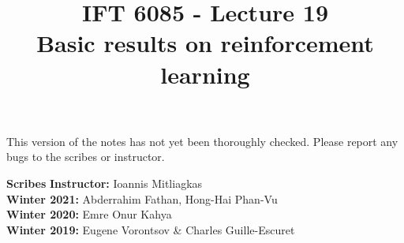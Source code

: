 \documentclass{article}
\title{IFT 6085 - Lecture 19 \\ 
Basic results on reinforcement learning}
\date{}
\begin{document}
 

\maketitle

\vspace{-0.5in}
\begin{center}
This version of the notes has not yet been thoroughly checked.
Please report any bugs to the scribes or instructor.
\end{center}
\vspace{0.2in}

\textbf{Scribes}\hfill
\textbf{Instructor:}  Ioannis Mitliagkas\\
\textbf{Winter 2021:} Abderrahim Fathan, Hong-Hai Phan-Vu\\
\textbf{Winter 2020:} Emre Onur Kahya\\
\textbf{Winter 2019:} Eugene Vorontsov \& Charles Guille-Escuret\\




\newcommand{\infgc}{\inf_{g \in \mathcal{C}}}
\newcommand{\supgc}{\sup_{g \in \mathcal{C}}}

\newcommand{\Prob}{\mathbb{P}}
\newcommand{\E}{\mathbb{E}}
\newcommand{\reals}{\mathbb{R}}



\end{document}
